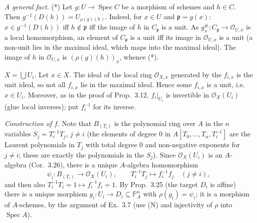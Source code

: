 \documentclass[11pt]{article}
\begin{document}
\emph{A general fact.} (*) Let $g:U\to\operatorname{Spec}C$ be a morphism of schemes and $h\in C$. Then $g^{-1}(D(h))=U_{\rho(g)(h)}$. Indeed, for $x\in U$ and $\mathfrak{p}=g(x)$: $x\in g^{-1}(D(h))$ iff $h\notin\mathfrak{p}$ iff the image of $h$ in $C_{\mathfrak{p}}$ is a unit. As $g^{\#}_x:C_{\mathfrak{p}}\to\mathcal{O}_{U,x}$ is a local homomorphism, an element of $C_{\mathfrak{p}}$ is a unit iff its image in $\mathcal{O}_{U,x}$ is a unit (a non-unit lies in the maximal ideal, which maps into the maximal ideal). The image of $h$ in $\mathcal{O}_{U,x}$ is $(\rho(g)(h))_x$, whence (*).

\emph{$X=\bigcup U_i$.} Let $x\in X$. The ideal of the local ring $\mathcal{O}_{X,x}$ generated by the $f_{i,x}$ is the unit ideal, so not all $f_{i,x}$ lie in the maximal ideal. Hence some $f_{i,x}$ is a unit, i.e.\ $x\in U_i$. Moreover, as in the proof of Prop.~3.12, $f_i|_{U_i}$ is invertible in $\mathcal{O}_X(U_i)$ (glue local inverses); put $f_i^{-1}$ for its inverse.

\emph{Construction of $f$.} Note that $B_{(T_i)}$ is the polynomial ring over $A$ in the $n$ variables $S_j=T_i^{-1}T_j$, $j\neq i$ (the elements of degree $0$ in $A[T_0,\dots,T_n,T_i^{-1}]$ are the Laurent polynomials in $T_j$ with total degree $0$ and non-negative exponents for $j\neq i$; these are exactly the polynomials in the $S_j$). Since $\mathcal{O}_X(U_i)$ is an $A$-algebra (Cor.~3.26), there is a unique $A$-algebra homomorphism
\[ \psi_i:B_{(T_i)}\to\mathcal{O}_X(U_i),\qquad T_i^{-1}T_j\mapsto f_i^{-1}f_j\quad(j\neq i), \]
and then also $T_i^{-1}T_i=1\mapsto f_i^{-1}f_i=1$. By Prop.~3.25 (the target $D_i$ is affine) there is a unique morphism $g_i:U_i\to D_i\subseteq\mathbb{P}^n_A$ with $\rho(g_i)=\psi_i$; it is a morphism of $A$-schemes, by the argument of Ex.~3.7 (use (N) and injectivity of $\rho$ into $\operatorname{Spec}A$).
\end{document}
